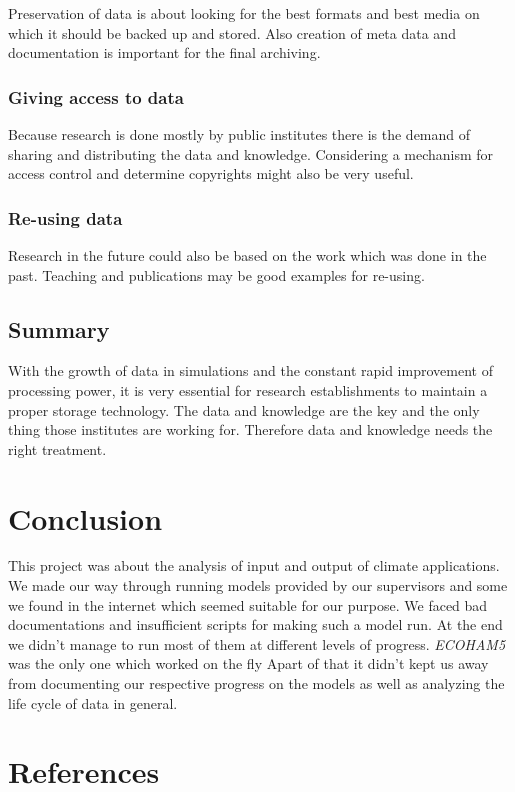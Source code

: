 \documentclass[]{article}
\begin{document}
Preservation of data is about looking for the best formats and best
media on which it should be backed up and stored. Also creation of meta
data and documentation is important for the final archiving.

\subsubsection{Giving access to data}\label{giving-access-to-data}

Because research is done mostly by public institutes there is the demand
of sharing and distributing the data and knowledge. Considering a
mechanism for access control and determine copyrights might also be very
useful.

\subsubsection{Re-using data}\label{re-using-data}

Research in the future could also be based on the work which was done in
the past. Teaching and publications may be good examples for re-using.

\subsection{Summary}\label{summary}

With the growth of data in simulations and the constant rapid
improvement of processing power, it is very essential for research
establishments to maintain a proper storage technology. The data and
knowledge are the key and the only thing those institutes are working
for. Therefore data and knowledge needs the right treatment.

\section{Conclusion}\label{conclusion-1}

This project was about the analysis of input and output of climate
applications. We made our way through running models provided by our
supervisors and some we found in the internet which seemed suitable for
our purpose. We faced bad documentations and insufficient scripts for
making such a model run. At the end we didn't manage to run most of them
at different levels of progress. \emph{ECOHAM5} was the only one which
worked on the fly Apart of that it didn't kept us away from documenting
our respective progress on the models as well as analyzing the life
cycle of data in general.

\section{References}\label{references}

\printbibliography
\end{document}
